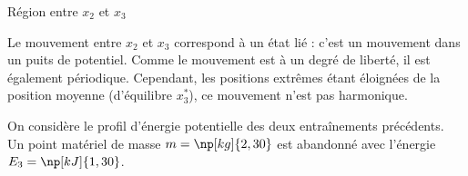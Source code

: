 
\begin{enonce}
	Région entre $x_2$ et $x_3$
\end{enonce}


\begin{corrige}
Le mouvement entre $x_2$ et $x_3$ correspond à un état lié : c'est un mouvement dans un puits de potentiel. Comme le mouvement est à un degré de liberté, il est également périodique. Cependant, les positions extrêmes étant éloignées de la position moyenne (d'équilibre $x^*_3$), ce mouvement n'est pas harmonique.
\end{corrige}


\finEntrainement





\hauteurLargeurCadreReponse		{8mm}{5cm}
\initialisationEntrainement

On considère le profil d'énergie potentielle des deux entraînements précédents.\\

Un point matériel de masse $m=\np[kg]{2,30}$ est abandonné avec l'énergie $E_3=\np[kJ]{1,30}$.

\debutEntrainement


